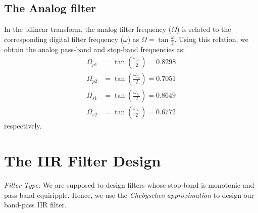 \documentclass{article}
\begin{document}
\subsection{The Analog filter}
In the bilinear transform, the analog filter frequency ($\Omega$) is related to the corresponding digital filter frequency ($\omega$) as $\Omega = \tan \frac{\omega}{2}$.  Using this relation, we obtain the analog pass-band and stop-band frequencies as:
\begin{align*}
\Omega_{p1} &= \tan\left(\frac{\omega_{p_1}}{2}\right) = 0.8298\\ 
\Omega_{p2} &= \tan\left(\frac{\omega_{p_2}}{2}\right) = 0.7051\\
\Omega_{s1} &= \tan\left(\frac{\omega_{s_1}}{2}\right) = 0.8649\\
\Omega_{s2} &= \tan\left(\frac{\omega_{s_2}}{2}\right) =  0.6772
\end{align*}
respectively.

\section{The IIR Filter Design}
{\em Filter Type:}  We are supposed to design filters whose stop-band is monotonic and pass-band equiripple.  
Hence, we use the {\em Chebyschev approximation} to design our band-pass IIR filter.
\end{document}
